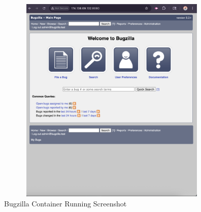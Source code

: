 \begin{figure}[htp]
    \centering
    \includegraphics[width=15cm, height=10cm]{png/DigitalOcean/Bugzilla.png}
    \caption{Bugzilla Container Running Screenshot}
    \label{fig:Bugzilla}
\end{figure}